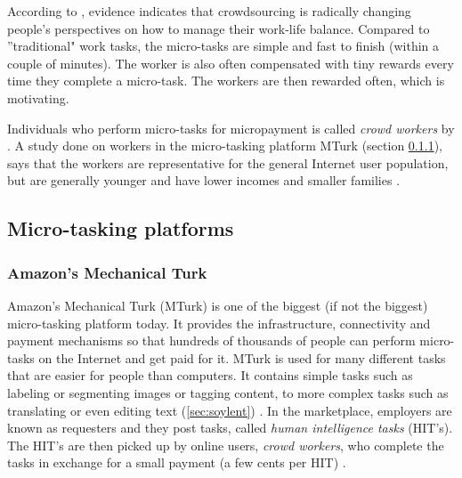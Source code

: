 According to \cite{Deng2016a}, evidence indicates that crowdsourcing is radically changing people's perspectives on how to manage their work-life balance. Compared to ''traditional" work tasks, the micro-tasks are simple and fast to finish (within a couple of minutes). The worker is also often compensated with tiny rewards every time they complete a micro-task. The workers are then rewarded often, which is motivating. 

Individuals who perform micro-tasks for micropayment is called \textit{crowd workers} by \citep{Deng2016a}. A study done on workers in the micro-tasking platform MTurk (section \ref{sec:mturk}), says that the workers are representative for the general Internet user population, but are generally younger and have lower incomes and smaller families \citep{Ipeirotis2010}.  

\subsection{Micro-tasking platforms}


\subsubsection[MTurk]{Amazon's Mechanical Turk}\label{sec:mturk}
Amazon's Mechanical Turk (MTurk) is one of the biggest (if not the biggest) micro-tasking platform today. It provides the infrastructure, connectivity and payment mechanisms so that hundreds of thousands of people can perform micro-tasks on the Internet and get paid for it. MTurk is used for many different tasks that are easier for people than computers. It contains simple tasks such as labeling or segmenting images or tagging content, to more complex tasks such as translating or even editing text (\ref{sec:soylent}) \citep{Franklin2011}.  In the marketplace, employers are known as requesters and they post tasks, called \textit{human intelligence tasks} (HIT's). The HIT's are then picked up by online users, \textit{crowd workers}, who complete the tasks in exchange for a small payment (a few cents per HIT) \citep{Ipeirotis2010}. 


